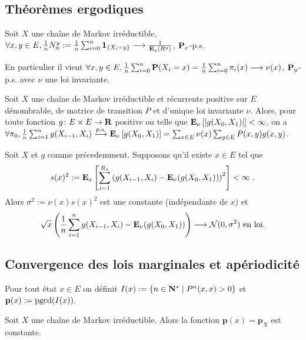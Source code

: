 \subsection{Théorèmes ergodiques}

	\begin{thm}
		Soit $X$ une chaîne de Markov irréductible, $\forall x,y \in E, \frac{1}{n} N_n^y := \frac{1}{n} \sum_{i = 0}^n \operatorname{\mathbf{1}}_{ \{ X_i = y \} } \longrightarrow \frac{1}{\mathbf{E}_y(R^y)}$, $\mathbf{P}_x$-p.s.
	\end{thm}

	En particulier il vient $\forall x,y \in E, \frac{1}{n} \sum_{i = 0}^n \mathbf{P}(X_i = x) = \frac{1}{n} \sum_{i = 0}^n \pi_i(x) \longrightarrow \nu(x)$, $\mathbf{P}_y$-p.s. avec $\nu$ une loi invariante.

	\begin{thm}
		Soit $X$ une chaîne de Markov irréductible et récurrente positive sur $E$ dénombrable, de matrice de transition $P$ et d'unique loi invariante $\nu$.
		Alors, pour toute fonction $g \colon E \times E \to \mathbf{R}$ positive ou telle que $\mathbf{E}_\nu \left[ \left\lvert g(X_0,X_1)\right\rvert \right] < \infty$, on a $\forall \pi_0, \frac{1}{n} \sum_{i = 1}^n g(X_{i - 1},X_i) \overset{\text{p.s.}}{\longrightarrow} \mathbf{E}_\nu \left[ g(X_0,X_1) \right] = \sum_{x \in E} \nu(x) \sum_{y \in E} P(x,y)g(x,y)$.
	\end{thm}

	\begin{thm}
		Soit $X$ et $g$ comme précedemment.
		Supposons qu'il existe $x \in E$ tel que
		$$s(x)^2 := \mathbf{E}_x \left[ \sum_{i = 1}^{R_x} \left( g(X_{i - 1},X_i) - \mathbf{E}_\nu(g(X_0,X_1)) \right)^2 \right] < \infty\ .$$
		Alors $\sigma^2 := \nu(x)s(x)^2$ est une constante (indépendante de $x$) et
		$$\sqrt{x} \left( \frac{1}{n} \sum_{i = 1}^n g(X_{i - 1},X_i) - \mathbf{E}_\nu(g(X_0,X_1)) \right) \longrightarrow \mathcal{N}(0,\sigma^2)\ \text{en loi.}$$
	\end{thm}


\subsection{Convergence des lois marginales et apériodicité}

	\begin{note}
		Pour tout état $x \in E$ on définit $I(x) := \{ n \in \mathbf{N}^* \mid P^n(x,x) > 0 \}$ et $\mathbf{p}(x) := \operatorname{pgcd}(I(x))$.
	\end{note}

	\begin{pop}
		Soit $X$ une chaîne de Markov irréductible.
		Alors la fonction $\mathbf{p}(x) = \mathbf{p}_X$ est constante.
	\end{pop}

